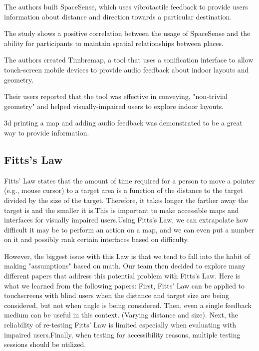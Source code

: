 \documentclass{article}
\begin{document}
\newline
The authors built SpaceSense, which uses vibrotactile feedback to provide users information about distance and direction towards a particular destination.
\newline
\par The study shows a positive correlation between the usage of SpaceSense and the ability for participants to maintain spatial relationships between places.


\cite{10.1145/1851600.1851606}
\par The authors created Timbremap, a tool that uses a sonification interface to allow touch-screen mobile devices to provide audio feedback about indoor layouts and geometry.
\newline
\par Their users reported that the tool was effective in conveying, "non-trivial geometry" and helped visually-impaired users to explore indoor layouts.
\newline

\cite{10.1145/3186894}
3d printing a map and adding audio feedback was demonstrated to be a great way to provide information.



\subsection{Fitts's Law}
Fitts' Law states that the amount of time required for a person to move a pointer (e.g., mouse cursor) to a target area is a function of the distance to the target divided by the size of the target. Therefore, it takes longer the farther away the target is and the smaller it is.This is important to make accessible maps and interfaces for visually impaired users.Using Fitts's Law, we can extrapolate how difficult it may be to perform an action on a map, and we can even put a number on it and possibly rank certain interfaces based on difficulty.
\newline
\par However, the biggest issue with this Law is that we tend to fall into the habit of making "assumptions" based on math. Our team then decided to explore many different papers that address this potential problem with Fitts's Law.
Here is what we learned from the following papers:
\newline
First, Fitts' Law can be applied to touchscreens with blind users when the distance and target size are being considered, but not when angle is being considered. 
Then, even a single feedback medium can be useful in this context. (Varying distance and size).
\cite{LAHIB201816}
\newline
Next, the reliability of re-testing Fitts' Law is limited especially when evaluating with impaired users.Finally, when testing for accessibility reasons, multiple testing sessions should be utilized. 
\cite{10.1145/3373625.3416999}
\end{document}
